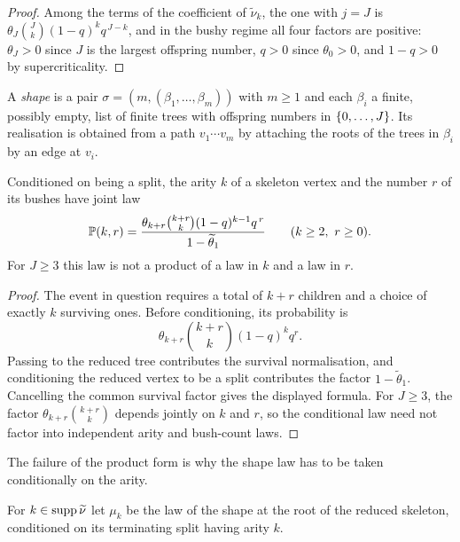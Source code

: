 \begin{proof}
\leanok
{}
Among the terms of the coefficient of $\widetilde\nu_k$, the one with $j=J$ is
$\theta_J\binom{J}{k}(1-q)^kq^{\,J-k}$, and in the bushy regime all four factors are positive:
$\theta_J>0$ since $J$ is the largest offspring number, $q>0$ since $\theta_0>0$, and
$1-q>0$ by supercriticality.
\end{proof}

\begin{definition}
\label{def:shape-general}
\leanok
{}
A \emph{shape} is a pair $\sigma=(m,(\beta_1,\dots,\beta_m))$ with $m\geq1$ and each $\beta_i$ a
finite, possibly empty, list of finite trees with offspring numbers in $\{0,\dots,J\}$. Its
realisation is obtained from a path $v_1\cdots v_m$ by attaching the roots of the trees in
$\beta_i$ by an edge at $v_i$.
\end{definition}

\begin{lemma}
\label{thm:split-joint}
\leanok
Conditioned on being a split, the arity $k$ of a skeleton vertex and the number $r$ of its
bushes have joint law
\[
 \mathbb{P}(k,r)=\frac{\theta_{k+r}\binom{k+r}{k}(1-q)^{k-1}q^{\,r}}{1-\widetilde\theta_1}
 \qquad(k\geq2,\ r\geq0).
\]
For $J\geq3$ this law is not a product of a law in $k$ and a law in $r$.
\end{lemma}

\begin{proof}
\leanok
{}
The event in question requires a total of $k+r$ children and a choice of exactly $k$ surviving
ones. Before conditioning, its probability is
\[
 \theta_{k+r}\binom{k+r}{k}(1-q)^kq^r.
\]
Passing to the reduced tree contributes the survival normalisation, and conditioning the reduced
vertex to be a split contributes the factor $1-\widetilde\theta_1$. Cancelling the common
survival factor gives the displayed formula. For $J\geq3$, the factor
$\theta_{k+r}\binom{k+r}{k}$ depends jointly on $k$ and $r$, so the conditional law need not
factor into independent arity and bush-count laws.
\end{proof}

The failure of the product form is why the shape law has to be taken conditionally on the
arity.

\begin{definition}
\label{def:conditional-laws}
\leanok
{}
For $k\in\operatorname{supp}\widetilde\nu$ let $\mu_k$ be the law of the shape at the root of the reduced
skeleton, conditioned on its terminating split having arity $k$.
\end{definition}

